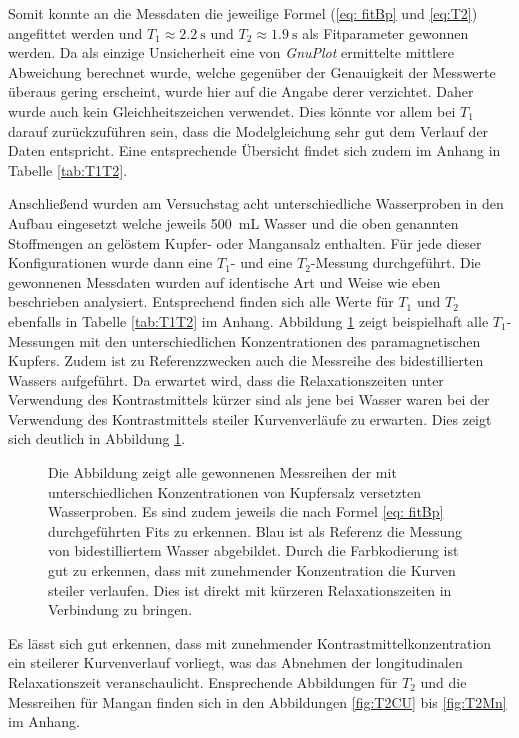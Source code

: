 Somit konnte an die Messdaten die jeweilige Formel (\eqref{eq: fitBp} und \eqref{eq:T2}) angefittet werden und $T_1 \approx \SI{2.2}{\second}$ und $T_2 \approx \SI{1.9}{\second}$ als Fitparameter gewonnen werden.
Da als einzige Unsicherheit eine von \textit{GnuPlot} ermittelte mittlere Abweichung berechnet wurde, welche gegenüber der Genauigkeit der Messwerte überaus gering erscheint, wurde hier auf die Angabe derer verzichtet.
Daher wurde auch kein Gleichheitszeichen verwendet. 
Dies könnte vor allem bei $T_1$ darauf zurückzuführen sein, dass die Modelgleichung sehr gut dem Verlauf der Daten entspricht.
Eine entsprechende Übersicht findet sich zudem im Anhang in Tabelle \ref{tab:T1T2}.

Anschließend wurden am Versuchstag acht unterschiedliche Wasserproben in den Aufbau eingesetzt welche jeweils \SI{500}{\milli \liter} Wasser und die oben genannten Stoffmengen an gelöstem Kupfer- oder Mangansalz enthalten.
Für jede dieser Konfigurationen wurde dann eine $T_1$- und eine $T_2$-Messung durchgeführt.
Die gewonnenen Messdaten wurden auf identische Art und Weise wie eben beschrieben analysiert.
Entsprechend finden sich alle Werte für $T_1$ und $T_2$ ebenfalls in Tabelle \ref{tab:T1T2} im Anhang.
Abbildung \ref{fig:T1CU} zeigt beispielhaft alle $T_1$-Messungen mit den unterschiedlichen Konzentrationen des paramagnetischen Kupfers.
Zudem ist zu Referenzzwecken auch die Messreihe des bidestillierten Wassers aufgeführt.
Da erwartet wird, dass die Relaxationszeiten unter Verwendung des Kontrastmittels kürzer sind als jene bei Wasser waren bei der Verwendung des Kontrastmittels steiler Kurvenverläufe zu erwarten.
Dies zeigt sich deutlich in Abbildung \ref{fig:T1CU}. 

\begin{figure}[H]
    \centering
    
    \caption[Übersicht über alle Messreihen der mit Kupfersalz versetzten Wasserproben.]{Die Abbildung zeigt alle gewonnenen Messreihen der mit unterschiedlichen Konzentrationen von Kupfersalz versetzten Wasserproben.
    Es sind zudem jeweils die nach Formel \eqref{eq: fitBp} durchgeführten Fits zu erkennen.
    Blau ist als Referenz die Messung von bidestilliertem Wasser abgebildet.
    Durch die Farbkodierung ist gut zu erkennen, dass mit zunehmender Konzentration die Kurven steiler verlaufen.
    Dies ist direkt mit kürzeren Relaxationszeiten in Verbindung zu bringen.}
    \label{fig:T1CU}
\end{figure}

Es lässt sich gut erkennen, dass mit zunehmender Kontrastmittelkonzentration ein steilerer Kurvenverlauf vorliegt, was das Abnehmen der longitudinalen Relaxationszeit veranschaulicht.
Ensprechende Abbildungen für $T_2$ und die Messreihen für Mangan finden sich in den Abbildungen \ref{fig:T2CU} bis \ref{fig:T2Mn} im Anhang.

